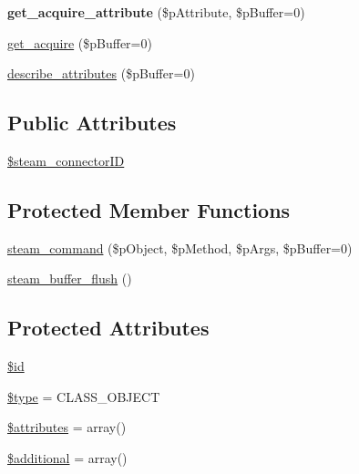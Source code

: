 \begin{DoxyCompactItemize}
\item 
\hypertarget{classsteam__object_a3f27a0a851aeefa4da96809c156afd25}{
{\bfseries get\_\-acquire\_\-attribute} (\$pAttribute, \$pBuffer=0)}
\label{classsteam__object_a3f27a0a851aeefa4da96809c156afd25}

\item 
\hyperlink{classsteam__object_aa5ae433355520dd3e35d821ea19f633d}{get\_\-acquire} (\$pBuffer=0)
\item 
\hyperlink{classsteam__object_a81913956826af30f9e684b45b9f097c8}{describe\_\-attributes} (\$pBuffer=0)
\end{DoxyCompactItemize}
\subsection*{Public Attributes}
\begin{DoxyCompactItemize}
\item 
\hyperlink{classsteam__object_aa2b7032221bf727957187a15d5afcca4}{\$steam\_\-connectorID}
\end{DoxyCompactItemize}
\subsection*{Protected Member Functions}
\begin{DoxyCompactItemize}
\item 
\hyperlink{classsteam__object_abe57bc45ef7afc3de92608cb39cc442f}{steam\_\-command} (\$pObject, \$pMethod, \$pArgs, \$pBuffer=0)
\item 
\hyperlink{classsteam__object_a10dad90c001f7f8ee3ce084016e9e48a}{steam\_\-buffer\_\-flush} ()
\end{DoxyCompactItemize}
\subsection*{Protected Attributes}
\begin{DoxyCompactItemize}
\item 
\hyperlink{classsteam__object_ae727592524230da242a2a30cfe8fe4e2}{\$id}
\item 
\hyperlink{classsteam__object_af872b2f64e385ab2f9d2b55927b9333b}{\$type} = CLASS\_\-OBJECT
\item 
\hyperlink{classsteam__object_ab8e4bfb9bf0ce92e7cc96f6392e6bb63}{\$attributes} = array()
\item 
\hyperlink{classsteam__object_a2fddf4f894d012367ffdfc3e7fab34a7}{\$additional} = array()
\end{DoxyCompactItemize}


